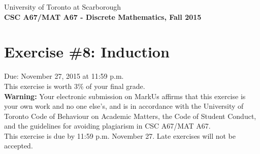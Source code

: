 \documentclass{article}
\begin{document}
{\large \noindent{}University of Toronto at Scarborough\\
\textbf{CSC A67/MAT A67 - Discrete Mathematics, Fall 2015}}

\section*{\huge Exercise \#8: Induction}

{\large Due: November 27, 2015 at 11:59 p.m.\\
This exercise is worth 3\% of your final grade.}\\[1em]
\textbf{Warning:} Your electronic submission on MarkUs affirms that this exercise is your own work and no
one else's, and is in accordance with the University of Toronto Code of Behaviour on Academic Matters,
the Code of Student Conduct, and the guidelines for avoiding plagiarism in CSC A67/MAT A67.\\[1ex]
This exercise is due by 11:59 p.m. November 27. Late exercises will not be accepted.\\[1ex]
\renewcommand{\labelenumi}{\arabic{enumi}.}
\renewcommand{\labelenumii}{(\alph{enumii})}
\end{document}
